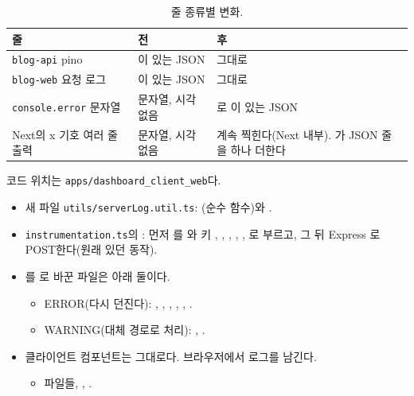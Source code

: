 \begin{table}[H]
  \caption{줄 종류별 변화.}\label{tab:06-errorjson}
  \small
  \begin{tabularx}{\linewidth}{L{5.2cm} L{2.8cm} Y}
    \toprule
    줄 & 전 & 후 \\
    \midrule
    \texttt{blog-api} pino & 이 있는 JSON & 그대로 \\
    \midrule
    \texttt{blog-web} 요청 로그 & 이 있는 JSON & 그대로 \\
    \midrule
    \texttt{console.error} 문자열 & 문자열, 시각 없음 & 로 이 있는 JSON \\
    \midrule
    Next의 x 기호 여러 줄 출력 & 문자열, 시각 없음 & 계속 찍힌다(Next 내부). 가 JSON 줄을 하나 더한다 \\
    \bottomrule
  \end{tabularx}
\end{table}

코드 위치는 \texttt{apps/dashboard\_client\_web}다.
\begin{itemize}[nosep]
  \item 새 파일 \texttt{utils/serverLog.util.ts}: (순수 함수)와 .
  \item \texttt{instrumentation.ts}의 : 먼저 를 와 키 , , , , , 로 부르고, 그 뒤 Express 로 POST한다(원래 있던 동작).
  \item {}를 로 바꾼 파일은 아래 둘이다.
  \begin{itemize}[nosep]
    \item ERROR(다시 던진다): , , , , , .
    \item WARNING(대체 경로로 처리): , .
  \end{itemize}
  \item 클라이언트 컴포넌트는 그대로다. 브라우저에서 로그를 남긴다.
  \begin{itemize}[nosep]
    \item {} 파일들, , .
  \end{itemize}
\end{itemize}

